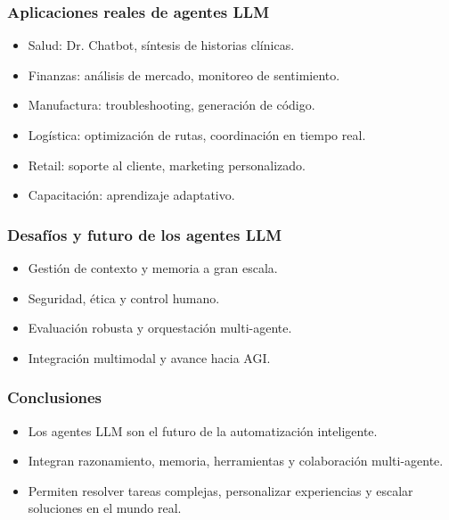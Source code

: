 \documentclass[aspectratio=169,xcolor=dvipsnames, t]{beamer}
\begin{document}
\begin{frame}
\frametitle{Aplicaciones reales de agentes LLM}
\begin{itemize}
    \item Salud: Dr. Chatbot, síntesis de historias clínicas.
    \item Finanzas: análisis de mercado, monitoreo de sentimiento.
    \item Manufactura: troubleshooting, generación de código.
    \item Logística: optimización de rutas, coordinación en tiempo real.
    \item Retail: soporte al cliente, marketing personalizado.
    \item Capacitación: aprendizaje adaptativo.
\end{itemize}
\end{frame}

\begin{frame}
\frametitle{Desafíos y futuro de los agentes LLM}
\begin{itemize}
    \item Gestión de contexto y memoria a gran escala.
    \item Seguridad, ética y control humano.
    \item Evaluación robusta y orquestación multi-agente.
    \item Integración multimodal y avance hacia AGI.
\end{itemize}
\end{frame}

\begin{frame}
\frametitle{Conclusiones}
\begin{itemize}
    \item Los agentes LLM son el futuro de la automatización inteligente.
    \item Integran razonamiento, memoria, herramientas y colaboración multi-agente.
    \item Permiten resolver tareas complejas, personalizar experiencias y escalar soluciones en el mundo real.
\end{itemize}
\end{frame}
\end{document}
